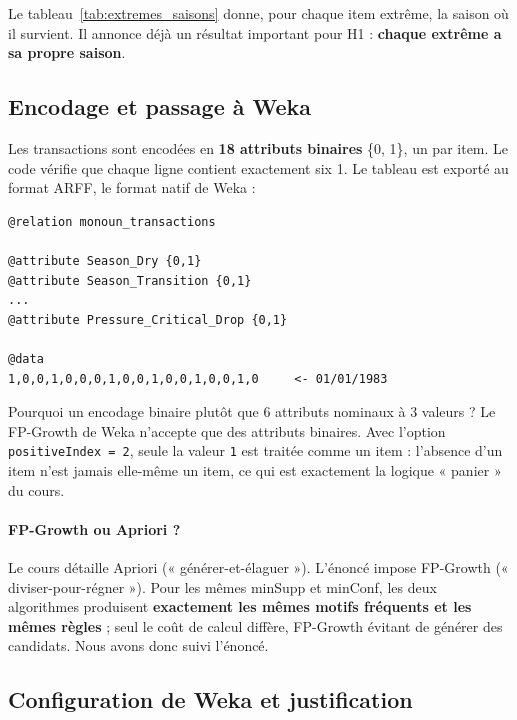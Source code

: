 \documentclass[12pt, a4paper]{article}
\newcommand{\tabin}[1]{\rowcolors{2}{GrisL}{white}}
\begin{document}
Le tableau~\ref{tab:extremes_saisons} donne, pour chaque item extrême, la saison où il
survient. Il annonce déjà un résultat important pour H1 : \textbf{chaque extrême a sa propre
saison}.

\begin{table}[H]
\centering
\caption{Répartition saisonnière des jours portant chaque item extrême.}
\label{tab:extremes_saisons}
\tabin{tab_extremes_saisons}
\end{table}

\subsection{Encodage et passage à Weka}
\label{sec:weka}

Les transactions sont encodées en \textbf{18 attributs binaires} \{0, 1\}, un par item. Le
code vérifie que chaque ligne contient exactement six 1. Le tableau est exporté au format
ARFF, le format natif de Weka :

\begin{code}
\begin{verbatim}
@relation monoun_transactions

@attribute Season_Dry {0,1}
@attribute Season_Transition {0,1}
...
@attribute Pressure_Critical_Drop {0,1}

@data
1,0,0,1,0,0,0,1,0,0,1,0,0,1,0,0,1,0     <- 01/01/1983
\end{verbatim}
\end{code}

Pourquoi un encodage binaire plutôt que 6 attributs nominaux à 3 valeurs ? Le FP-Growth de Weka
n'accepte que des attributs binaires. Avec l'option \texttt{positiveIndex = 2}, seule la valeur
\texttt{1} est traitée comme un item : l'absence d'un item n'est jamais elle-même un item, ce
qui est exactement la logique « panier » du cours.

\paragraph{FP-Growth ou Apriori ?} Le cours détaille Apriori (« générer-et-élaguer »).
L'énoncé impose FP-Growth (« diviser-pour-régner »). Pour les mêmes minSupp et minConf, les deux
algorithmes produisent \textbf{exactement les mêmes motifs fréquents et les mêmes règles} ; seul
le coût de calcul diffère, FP-Growth évitant de générer des candidats. Nous avons donc suivi
l'énoncé.

\subsection{Configuration de Weka et justification}
\label{sec:config}
\end{document}

